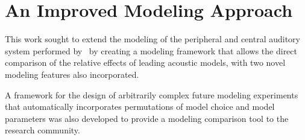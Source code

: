 \section{An Improved Modeling Approach} %
\label{sec:an_improved_modeling_approach}
This work sought to extend the modeling of the peripheral and central auditory system performed by~\cite{Mehraei2015Auditory} by creating a modeling framework that allows the direct comparison of the relative effects of leading acoustic models, with two novel modeling features also incorporated.  

A framework for the design of arbitrarily complex future modeling experiments that automatically incorporates permutations of model choice and model parameters was also developed to provide a modeling comparison tool to the research community. 